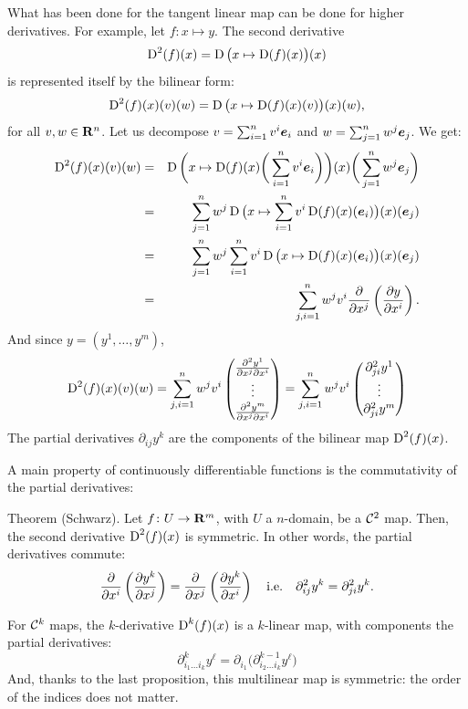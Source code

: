 What has been done for the tangent linear map can be done for higher derivatives.
For example,
let $f \colon x \mapsto y$.
The second derivative
$$%
  \Der^2(f)(x) = \Der\big(x \mapsto \Der(f)(x)\big)(x)
  $$%
is represented itself by the bilinear form:
$$%
  \Der^2(f)(x)(v)(w) = \Der\big(x \mapsto \Der(f)(x)(v)\big)(x)(w),
  $$%
for all $v, w \in \mathbf{R}^n$.
Let us decompose $v = \sum_{i=1}^n v^i {\boldsymbol e}_i$ and $w = \sum_{j=1}^n w^j {\boldsymbol e}_j$.
We get:
\begin{eqnarray*}
  \operatorname{D}^2(f)(x)(v)(w) & = & \operatorname{D}\bigg(x \mapsto \operatorname{D}(f)(x)\bigg(\sum_{i=1}^n v^i {\boldsymbol e}_i\bigg)\bigg)(x)\bigg(\sum_{j=1}^n w^j {\boldsymbol e}_j\bigg) \\
  & = & \sum_{j=1}^n w^j \operatorname{D}\big(x \mapsto \sum_{i=1}^n v^i \operatorname{D}(f)(x)({\boldsymbol e}_i)\big)(x)({\boldsymbol e}_j) \\
  & = & \sum_{j=1}^n w^j \sum_{i=1}^n v^i  \operatorname{D}\big(x \mapsto \operatorname{D}(f)(x)({\boldsymbol e}_i)\big)(x)({\boldsymbol e}_j) \\
  & = & \sum_{j,i=1}^n w^j v^i {\partial \over \partial x^j}\left({\partial y \over \partial x^i}\right).
\end{eqnarray*}
And since $y = (y^1, \dots, y^m)$,
$$%
  \Der^2(f)(x)(v)(w) = \sum_{j,i=1}^n w^j v^i \Vector{
  {\partial^2 y^1 \over \partial x^j \partial x^i} \\[.1em] \vdots \\[.1em] {\partial^2 y^m \over \partial x^j \partial x^i}
  }
  = \sum_{j,i=1}^n w^j v^i \Vector{
  \partial^2_{ji} y^1 \\[.1em] \vdots \\[.1em] \partial^2_{ji} y^m
  }
  $$%
The partial derivatives $\partial_{ij} y^k$ are the components of the bilinear map $\operatorname{D}^2(f)(x)$.

A main property of continuously differentiable functions is the commutativity of the partial derivatives:

\begin{Article}{Theorem (Schwarz).}{\itshape}
  Let $f \colon U \to \mathbf{R}^m$,
  with $U$ a $n$-domain,
  be a ${\mathcal{C}}^{2}$ map.
  Then,
  the second derivative $\operatorname{D}^2(f)(x)$ is symmetric.
  In other words,
  the partial derivatives commute:
  $$%
    {\partial \over \partial x^i}\left({\partial y^k \over \partial x^j}\right) =
    {\partial \over \partial x^j}\left({\partial y^k \over \partial x^i}\right)
    \quad \text{i.e.} \quad \partial^2_{ij}y^k = \partial^2_{ji}y^k.
    $$%
\end{Article}
For ${\mathcal{C}}^{k}$ maps,
the $k$-derivative $\operatorname{D}^k(f)(x)$ is a $k$-linear map,
with components the partial derivatives:
$$%
  \partial^k_{i_1 \dots i_k} y^\ell  = \partial_{i_1} \big(\partial_{i_2 \dots i_k}^{k-1} y^\ell\big)
  $$%
And,
thanks to the last proposition,
this multilinear map is symmetric:
the order of the indices does not matter.

